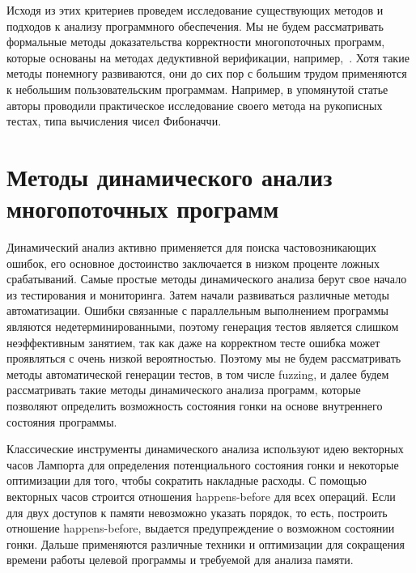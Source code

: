 Исходя из этих критериев проведем исследование существующих методов и подходов к анализу программного обеспечения.
Мы не будем рассматривать формальные методы доказательства корректности многопоточных программ, которые основаны на методах дедуктивной верификации, например,~\cite{Le:2015:TRC}.
Хотя такие методы понемногу развиваются, они до сих пор с большим трудом применяются к небольшим пользовательским программам. 
Например, в упомянутой статье авторы проводили практическое исследование своего метода на рукописных тестах, типа вычисления чисел Фибоначчи.

\section{Методы динамического анализ многопоточных программ}
\label{rw:dynamic}

Динамический анализ активно применяется для поиска частовозникающих ошибок, его основное достоинство заключается в низком проценте ложных срабатываний.
Самые простые методы динамического анализа берут свое начало из тестирования и мониторинга.
Затем начали развиваться различные методы автоматизации.
Ошибки связанные с параллельным выполнением программы являются недетерминированными, поэтому генерация тестов является слишком неэффективным занятием, так как даже на корректном тесте ошибка может проявляться с очень низкой вероятностью.
Поэтому мы не будем рассматривать методы автоматической генерации тестов, в том числе fuzzing, и далее будем рассматривать такие методы динамического анализа программ, которые позволяют определить возможность состояния гонки на основе внутреннего состояния программы.

Классические инструменты динамического анализа используют идею векторных часов Лампорта для определения потенциального состояния гонки и некоторые оптимизации для того, чтобы сократить накладные расходы.
С помощью векторных часов строится отношения happens-before для всех операций.
Если для двух доступов к памяти невозможно указать порядок, то есть, построить отношение happens-before, выдается предупреждение о возможном состоянии гонки. 
Дальше применяются различные техники и оптимизации для сокращения времени работы целевой программы и требуемой для анализа памяти.

